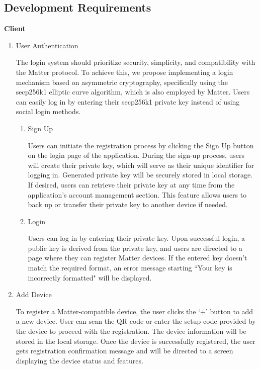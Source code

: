 \documentclass[conference]{IEEEtran}
\begin{document}
	\subsection{Development Requirements}
	{\centering \textbf{Client} \par}
	\begin{enumerate}[itemsep=2ex, parsep=1ex]
		\item User Authentication

			The login system should prioritize security, simplicity, and compatibility
			with the Matter protocol. To achieve this, we propose implementing a login
			mechanism based on asymmetric cryptography, specifically using the secp256k1
			elliptic curve algorithm, which is also employed by Matter. Users can easily
			log in by entering their secp256k1 private key instead of using social login
			methods.

			\begin{enumerate}[itemsep=2ex, parsep=1ex]
				\item Sign Up

					Users can initiate the registration process by clicking the Sign Up
					button on the login page of the application. During the sign-up process,
					users will create their private key, which will serve as their unique identifier
					for logging in. Generated private key will be securely stored in local
					storage. If desired, users can retrieve their private key at any time
					from the application's account management section. This feature allows
					users to back up or transfer their private key to another device if needed.

				\item Login

					Users can log in by entering their private key. Upon successful login,
					a public key is derived from the private key, and users are directed to
					a page where they can register Matter devices. If the entered key
					doesn't match the required format, an error message starting ``Your key
					is incorrectly formatted" will be displayed.
			\end{enumerate}

		\item Add Device

			To register a Matter-compatible device, the user clicks the ‘+’ button to add
			a new device. User can scan the QR code or enter the setup code provided
			by the device to proceed with the registration. The device information will
			be stored in the local storage. Once the device is successfully registered,
			the user gets registration confirmation message and will be directed to a screen
			displaying the device status and features.


\end{enumerate}
\end{document}
